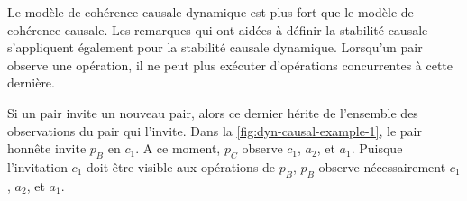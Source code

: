 
Le modèle de cohérence causale dynamique est plus fort que le modèle de cohérence causale.
Les remarques qui ont aidées à définir la stabilité causale s'appliquent également pour la stabilité causale dynamique.
Lorsqu'un pair observe une opération, il ne peut plus exécuter d'opérations concurrentes à cette dernière.

Si un pair invite un nouveau pair, alors ce dernier hérite de l'ensemble des observations du pair qui l'invite.
Dans la \autoref{fig:dyn-causal-example-1}, le pair honnête invite $p_B$ en $c_1$.
A ce moment, $p_C$ observe $c_1$, $a_2$, et $a_1$.
Puisque l'invitation $c_1$ doit être visible aux opérations de $p_B$, $p_B$ observe nécessairement $c_1$, $a_2$, et $a_1$.

